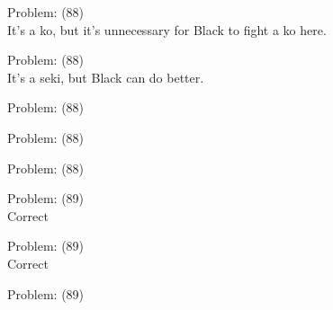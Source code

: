 \documentclass[11pt]{article}
\begin{document}
\begin{minipage}[t]{0.5\textwidth}
  {\centering
  
Problem: (88)\\
It's a ko, but it's unnecessary for Black to fight a ko here.\\
  }
\end{minipage}
\begin{minipage}[t]{0.5\textwidth}
  {\centering
  
Problem: (88)\\
It's a seki, but Black can do better.\\
  }
\end{minipage}
\begin{minipage}[t]{0.5\textwidth}
  {\centering
  
Problem: (88)\\
  }
\end{minipage}
\begin{minipage}[t]{0.5\textwidth}
  {\centering
  
Problem: (88)\\
  }
\end{minipage}
\begin{minipage}[t]{0.5\textwidth}
  {\centering
  
Problem: (88)\\
  }
\end{minipage}
\begin{minipage}[t]{0.5\textwidth}
  {\centering
  
Problem: (89)\\
Correct\\
  }
\end{minipage}
\begin{minipage}[t]{0.5\textwidth}
  {\centering
  
Problem: (89)\\
Correct\\
  }
\end{minipage}
\begin{minipage}[t]{0.5\textwidth}
  {\centering
  
Problem: (89)\\
  }
\end{minipage}
\end{document}
